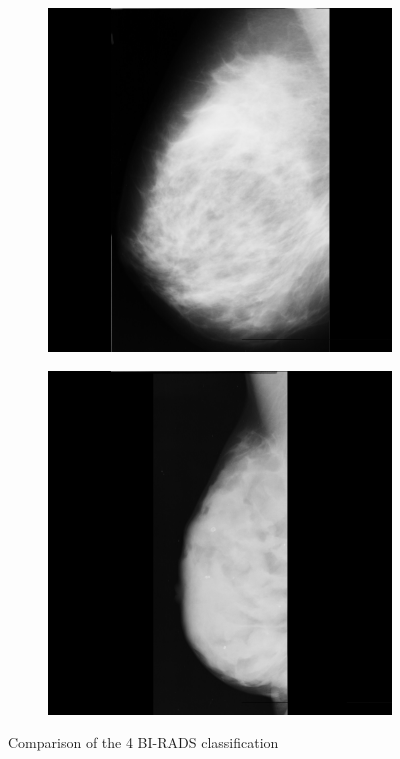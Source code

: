 \begin{figure}[!ht]
\begin{subfigure}[ht!]{0.2\textwidth}
          \caption{}
          \label{fig:birads-b}
    \end{subfigure}
    \begin{subfigure}[ht!]{0.2\textwidth}
          \includegraphics[width=\textwidth]{Chapter1/background-img/c.png}
          \caption{}
          \label{fig:birads-c}
    \end{subfigure}
    \begin{subfigure}[ht!]{0.2\textwidth}
          \includegraphics[width=\textwidth]{Chapter1/background-img/d.png}
          \caption{}
          \label{fig:birads-d}
    \end{subfigure}
  \caption{Comparison of the 4 BI-RADS classification}
  \label{fig:4-birads}
\end{figure}

